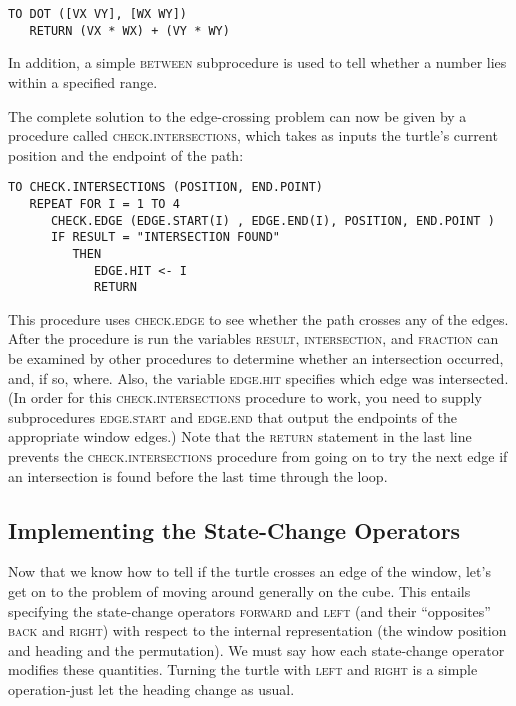 \documentclass{book}
\begin{document}
\begin{verbatim}
TO DOT ([VX VY], [WX WY])
   RETURN (VX * WX) + (VY * WY)
\end{verbatim}
In addition, a simple \textsc{between} subprocedure is used to tell whether a
number lies within a specified range.

The complete solution to the edge-crossing problem can now be given
by a procedure called \textsc{check}\textsc{.intersections}, which takes as inputs the
turtle's current position and the endpoint of the path:

\begin{verbatim}
TO CHECK.INTERSECTIONS (POSITION, END.POINT)
   REPEAT FOR I = 1 TO 4
      CHECK.EDGE (EDGE.START(I) , EDGE.END(I), POSITION, END.POINT )
      IF RESULT = "INTERSECTION FOUND"
         THEN
            EDGE.HIT <- I
            RETURN
\end{verbatim}
This procedure uses \textsc{check}\textsc{.edge} to see whether the path crosses any of
the edges. After the procedure is run the variables \textsc{result}, \textsc{intersection},
and \textsc{fraction} can be examined by other procedures to determine whether
an intersection occurred, and, if so, where. Also, the variable \textsc{edge}\textsc{.hit}
specifies which edge was intersected. (In order for this \textsc{check}\textsc{.intersections} procedure to work, you need to supply subprocedures \textsc{edge}\textsc{.start}
and \textsc{edge}\textsc{.end} that output the endpoints of the appropriate window
edges.)
Note that the \textsc{return} statement in the last line prevents the \textsc{check}\textsc{.intersections} procedure from going on to try the next edge if an intersection is found before the last time through the loop.

\subsection{Implementing the State-Change Operators}

Now that we know how to tell if the turtle crosses an edge of the window,
let's get on to the problem of moving around generally on the cube.
This entails specifying the state-change operators \textsc{forward} and \textsc{left}
(and their ``opposites'' \textsc{back} and \textsc{right}) with respect to the internal
representation (the window position and heading and the permutation).
We must say how each state-change operator modifies these quantities.
Turning the turtle with \textsc{left} and \textsc{right} is a simple operation-just let
the heading change as usual.
\end{document}
